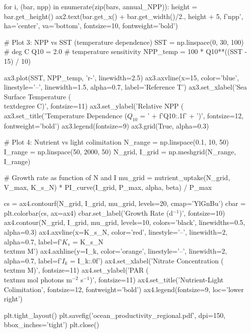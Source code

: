 \documentclass[a4paper, 11pt]{article}
\begin{document}
\begin{pycode}
for i, (bar, npp) in enumerate(zip(bars, annual_NPP)):
    height = bar.get_height()
    ax2.text(bar.get_x() + bar.get_width()/2., height + 5,
             f'{npp}', ha='center', va='bottom', fontsize=10, fontweight='bold')

# Plot 3: NPP vs SST (temperature dependence)
SST = np.linspace(0, 30, 100)  # deg C
Q10 = 2.0  # temperature sensitivity
NPP_temp = 100 * Q10**((SST - 15) / 10)

ax3.plot(SST, NPP_temp, 'r-', linewidth=2.5)
ax3.axvline(x=15, color='blue', linestyle='--', linewidth=1.5, alpha=0.7, label='Reference T')
ax3.set_xlabel('Sea Surface Temperature (\\textdegree C)', fontsize=11)
ax3.set_ylabel('Relative NPP (\\%
ax3.set_title('Temperature Dependence ($Q_{10}$ = ' + f'{Q10:.1f}' + ')', fontsize=12, fontweight='bold')
ax3.legend(fontsize=9)
ax3.grid(True, alpha=0.3)

# Plot 4: Nutrient vs light colimitation
N_range = np.linspace(0.1, 10, 50)
I_range = np.linspace(50, 2000, 50)
N_grid, I_grid = np.meshgrid(N_range, I_range)

# Growth rate as function of N and I
mu_grid = nutrient_uptake(N_grid, V_max, K_s_N) * PI_curve(I_grid, P_max, alpha, beta) / P_max

cs = ax4.contourf(N_grid, I_grid, mu_grid, levels=20, cmap='YlGnBu')
cbar = plt.colorbar(cs, ax=ax4)
cbar.set_label('Growth Rate (d$^{-1}$)', fontsize=10)
ax4.contour(N_grid, I_grid, mu_grid, levels=10, colors='black', linewidths=0.5, alpha=0.3)
ax4.axvline(x=K_s_N, color='red', linestyle='--', linewidth=2, alpha=0.7, label=f'$K_s$ = {K_s_N} \\textmu M')
ax4.axhline(y=I_k, color='orange', linestyle='--', linewidth=2, alpha=0.7, label=f'$I_k$ = {I_k:.0f}')
ax4.set_xlabel('Nitrate Concentration (\\textmu M)', fontsize=11)
ax4.set_ylabel('PAR (\\textmu mol photons m$^{-2}$ s$^{-1}$)', fontsize=11)
ax4.set_title('Nutrient-Light Colimitation', fontsize=12, fontweight='bold')
ax4.legend(fontsize=9, loc='lower right')

plt.tight_layout()
plt.savefig('ocean_productivity_regional.pdf', dpi=150, bbox_inches='tight')
plt.close()
\end{pycode}
\end{document}
